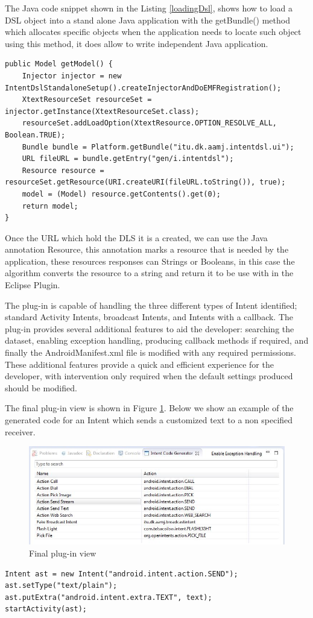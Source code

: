 The Java code snippet shown in the Listing \ref{loadingDsl}, shows how to load a DSL object into a stand alone Java application with the getBundle() method which allocates specific objects when the application needs to locate such object using this method, it does allow to write independent Java application.

{\footnotesize\begin{lstlisting}[label=loadingDsl,caption=Loading a DSL object into Java application]
public Model getModel() {
	Injector injector = new IntentDslStandaloneSetup().createInjectorAndDoEMFRegistration();
	XtextResourceSet resourceSet = injector.getInstance(XtextResourceSet.class);
	resourceSet.addLoadOption(XtextResource.OPTION_RESOLVE_ALL, Boolean.TRUE);
	Bundle bundle = Platform.getBundle("itu.dk.aamj.intentdsl.ui");
	URL fileURL = bundle.getEntry("gen/i.intentdsl");
	Resource resource = resourceSet.getResource(URI.createURI(fileURL.toString()), true);
	model = (Model) resource.getContents().get(0);
	return model;
}
\end{lstlisting}}

Once the URL which hold the DLS it is a created, we can use the Java annotation Resource, this annotation marks a resource that is needed by the application, these resources responses can Strings or Booleans, in this case the algorithm converts the resource to a string and return it to be use with in the Eclipse Plugin. 
 
The plug-in is capable of handling the three different types of Intent identified; standard Activity Intents, broadcast Intents, and Intents with a callback. The plug-in provides several additional features to aid the developer: searching the dataset, enabling exception handling, producing callback methods if required, and finally the AndroidManifest.xml file is modified with any required permissions. These additional features provide a quick and efficient experience for the developer, with intervention only required when the default settings produced should be modified.

The final plug-in view is shown in Figure \ref{codegeneratorview}. Below we show an example of the generated code for an Intent which sends a customized text to a non specified receiver.

\begin{figure}[t]
\label{codegeneratorview}
  \centering
    \includegraphics[width=\textwidth]{codegenerator}
  \caption{Final plug-in view}
\end{figure}

{\footnotesize\begin{lstlisting}
Intent ast = new Intent("android.intent.action.SEND");
ast.setType("text/plain");
ast.putExtra("android.intent.extra.TEXT", text);
startActivity(ast);		
\end{lstlisting}}